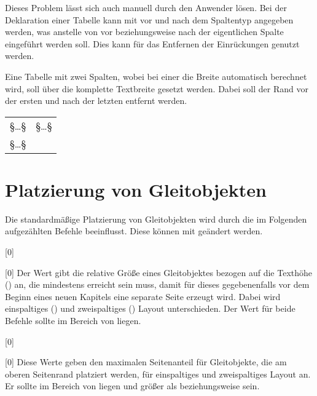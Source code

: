 Dieses Problem lässt sich auch manuell durch den Anwender lösen. Bei der 
Deklaration einer Tabelle kann mit \PParameter{\dots} vor und 
nach dem Spaltentyp angegeben werden, was anstelle von  vor 
beziehungsweise nach der eigentlichen Spalte eingeführt werden soll. Dies kann 
für das Entfernen der Einrückungen genutzt werden.
%
\begin{Example}
Eine Tabelle mit zwei Spalten, wobei bei einer die Breite automatisch berechnet 
wird, soll über die komplette Textbreite gesetzt werden. Dabei soll der Rand 
vor der ersten und nach der letzten entfernt werden.
\begin{Code}[escapechar=§]
\begin{tabularx}{\textwidth}{@{}lX@{}}
§\dots§ & §\dots§ \tabularnewline
§\dots§
\end{tabularx}
\end{Code}
\end{Example}



\section{Platzierung von Gleitobjekten}
\label{sec:tips:floats}
Die standardmäßige Platzierung von Gleitobjekten wird durch die im Folgenden 
aufgezählten Befehle beeinflusst. Diese können mit 
 geändert werden.

\begin{Declaration}{}[0\floatpagefraction]
\begin{Declaration}{}[0\dblfloatpagefraction]
\printdeclarationlist*%
%
Der Wert gibt die relative Größe eines Gleitobjektes bezogen auf die Texthöhe 
() an, die mindestens erreicht sein muss, damit für dieses 
gegebenenfalls vor dem Beginn eines neuen Kapitels eine separate Seite erzeugt 
wird. Dabei wird einspaltiges () und zweispaltiges 
() Layout unterschieden. Der Wert für beide 
Befehle sollte im Bereich von  liegen.
\end{Declaration}
\end{Declaration}

\begin{Declaration}{}[0\topfraction]
\begin{Declaration}{}[0\dbltopfraction]
\printdeclarationlist*%
%
Diese Werte geben den maximalen Seitenanteil für Gleitobjekte, die am oberen 
Seitenrand platziert werden, für einspaltiges und zweispaltiges Layout an. Er 
sollte im Bereich von  liegen und größer als 
 beziehungsweise  sein.
\end{Declaration}
\end{Declaration}

